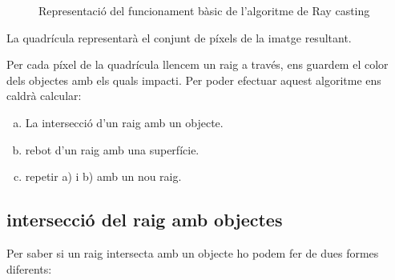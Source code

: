 \documentclass{article}
\begin{document}
\begin{figure}
   
\caption{Representació del funcionament bàsic de l'algoritme de Ray casting}
\end{figure}

La quadrícula representarà el conjunt de píxels de la imatge resultant.

Per cada píxel de la quadrícula llencem un raig a través, ens guardem el color dels objectes amb els quals impacti.
Per poder efectuar aquest algoritme ens caldrà calcular:
  \begin{enumerate}[a)]
     \item La intersecció d'un raig amb un objecte.
     \item rebot d'un raig amb una superfície.
     \item  repetir a) i b) amb un nou raig.
  \end{enumerate} 
\subsection{intersecció del raig amb objectes}
Per saber si un raig intersecta amb un objecte ho podem fer de dues formes diferents:
\end{document}
